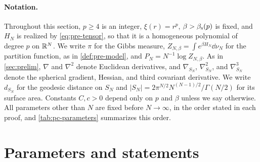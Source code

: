 \paragraph{Notation.}
Throughout this section, $p\ge4$ is an integer, $\xi(r)=r^p$, $\beta>\beta_{\mathrm s}(p)$ is fixed, and $H_N$ is realized by \eqref{eq:pre-tensor}, so that it is a homogeneous polynomial of degree $p$ on $\mathbb R^N$. We write $\pi$ for the Gibbs measure, $Z_{N,\beta}=\int e^{\beta H_N}\dd\nu_N$ for the partition function, as in \cref{def:pre-model}, and $P_N=N^{-1}\log Z_{N,\beta}$. As in \cref{sec:prelim}, $\nabla$ and $\nabla^2$ denote Euclidean derivatives, and $\nabla_{S_N}$, $\nabla^2_{S_N}$, and $\nabla^3_{S_N}$ denote the spherical gradient, Hessian, and third covariant derivative. We write $d_{S_N}$ for the geodesic distance on $S_N$ and $|S_N|=2\pi^{N/2}N^{(N-1)/2}/\Gamma(N/2)$ for its surface area. Constants $C,c>0$ depend only on $p$ and $\beta$ unless we say otherwise. All parameters other than $N$ are fixed before $N\to\infty$, in the order stated in each proof, and \cref{tab:pc-parameters} summarizes this order.

\section{Parameters and statements}\label{sec:pc-statements}

